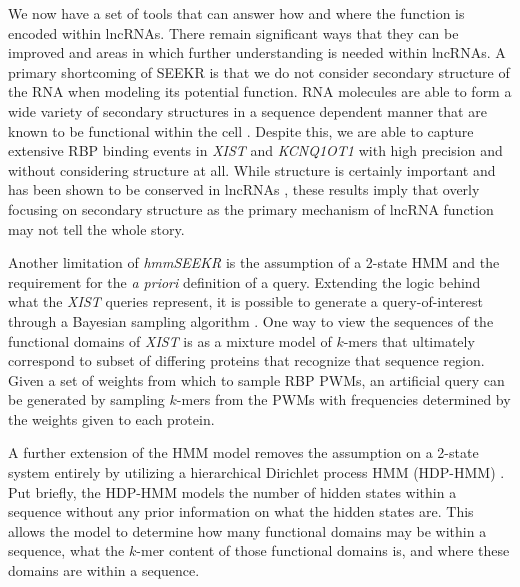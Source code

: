 We now have a set of tools that can answer how and where the function is encoded within lncRNAs. There remain significant ways that they can be improved and areas in which further understanding is needed within lncRNAs. A primary shortcoming of SEEKR is that we do not consider secondary structure of the RNA when modeling its potential function. RNA molecules are able to form a wide variety of secondary structures in a sequence dependent manner that are known to be functional within the cell \cite{Siegfried2014RNASHAPE-MaP,Wan2011UnderstandingStructure}. Despite this, we are able to capture extensive RBP binding events in \emph{XIST} and \emph{KCNQ1OT1} with high precision and without considering structure at all. While structure is certainly important and has been shown to be conserved in lncRNAs \cite{Johnsson2014EvolutionaryFunction}, these results imply that overly focusing on secondary structure as the primary mechanism of lncRNA function may not tell the whole story.

Another limitation of \emph{hmmSEEKR} is the assumption of a 2-state HMM and the requirement for the \emph{a priori} definition of a query. Extending the logic behind what the \emph{XIST} queries represent, it is possible to generate a query-of-interest through a Bayesian sampling algorithm \cite{McLachlan2019FiniteModels}. One way to view the sequences of the functional domains of \emph{XIST} is as a mixture model of $k$-mers that ultimately correspond to subset of differing proteins that recognize that sequence region. Given a set of weights from which to sample RBP PWMs, an artificial query can be generated by sampling $k$-mers from the PWMs with frequencies determined by the weights given to each protein. 

A further extension of the HMM model removes the assumption on a 2-state system entirely by utilizing a hierarchical Dirichlet process HMM (HDP-HMM) \cite{Johnson2013BayesianModels}. Put briefly, the HDP-HMM models the number of hidden states within a sequence without any prior information on what the hidden states are. This allows the model to determine how many functional domains may be within a sequence, what the $k$-mer content of those functional domains is, and where these domains are within a sequence. 

\begin{singlespace}
\printbibliography[heading=bibintoc,title={References}]
\end{singlespace}